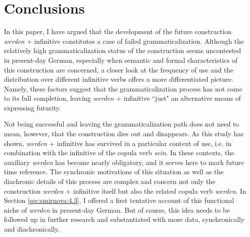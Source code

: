 \documentclass[output=paper,colorlinks,citecolor=brown]{langscibook}
\begin{document}
\section{Conclusions} \label{sec:smirnova:5}
In this paper, I have argued that the development of the future construction \textit{werden} + infinitive constitutes a case of failed grammaticalization. Although the relatively high grammaticalization status of the construction seems uncontested in present-day German, especially when semantic and formal characteristics of this construction are concerned, a closer look at the frequency of use and the distribution over different infinitive verbs offers a more differentiated picture. Namely, these factors suggest that the grammaticalization process has not come to its full completion, leaving \textit{werden} + infinitive ``just" an alternative means of expressing futurity. 
\par Not being successful and leaving the grammaticalization path does not need to mean, however, that the construction dies out and disappears. As this study has shown, \textit{werden} + infinitive has survived in a particular context of use, i.e. in combination with the infinitive of the copula verb \textit{sein}. In these contexts, the auxiliary \textit{werden} has become nearly obligatory, and it serves here to mark future time reference. The synchronic motivations of this situation as well as the diachronic details of this process are complex and concern not only the construction \textit{werden} + infinitive itself but also the related copula verb \textit{werden}. In Section \ref{sec:smirnova:4.3}, I offered a first tentative account of this functional niche of \textit{werden} in present-day German. But of course, this idea needs to be followed up in further research and substantiated with more data, synchronically and diachronically.


\sloppy
\printbibliography[heading=subbibliography,notkeyword=this]
\end{document}
